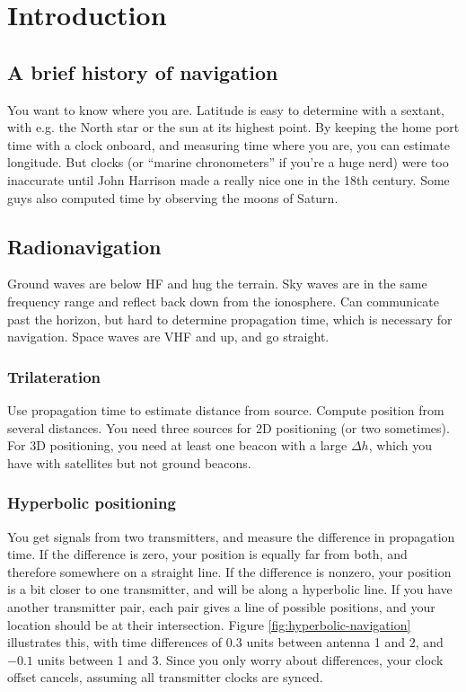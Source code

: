 \section{Introduction}

\subsection{A brief history of navigation}

You want to know where you are. Latitude is easy to determine with a sextant, with e.g. the North star or the sun at its highest point. By keeping the home port time with a clock onboard, and measuring time where you are, you can estimate longitude. But clocks (or ``marine chronometers'' if you're a huge nerd) were too inaccurate until John Harrison made a really nice one in the 18th century. Some guys also computed time by observing the moons of Saturn.

\subsection{Radionavigation}

Ground waves are below HF and hug the terrain. Sky waves are in the same frequency range and reflect back down from the ionosphere. Can communicate past the horizon, but hard to determine propagation time, which is necessary for navigation. Space waves are VHF and up, and go straight.

\subsubsection{Trilateration}
Use propagation time to estimate distance from source. Compute position from several distances. You need three sources for 2D positioning (or two sometimes). For 3D positioning, you need at least one beacon with a large $\Delta h$, which you have with satellites but not ground beacons.

\subsubsection{Hyperbolic positioning}
You get signals from two transmitters, and measure the difference in propagation time. If the difference is zero, your position is equally far from both, and therefore somewhere on a straight line. If the difference is nonzero, your position is a bit closer to one transmitter, and will be along a hyperbolic line. If you have another transmitter pair, each pair gives a line of possible positions, and your location should be at their intersection. Figure \ref{fig:hyperbolic-navigation} illustrates this, with time differences of $0.3$ units between antenna 1 and 2, and $-0.1$ units between 1 and 3. Since you only worry about differences, your clock offset cancels, assuming all transmitter clocks are synced.

